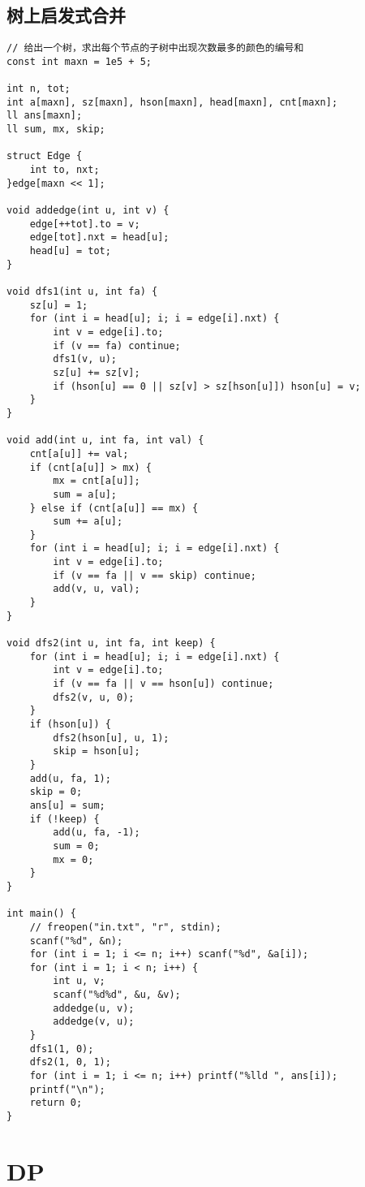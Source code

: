 \subsection{树上启发式合并}
\begin{lstlisting}
// 给出一个树，求出每个节点的子树中出现次数最多的颜色的编号和
const int maxn = 1e5 + 5;

int n, tot;
int a[maxn], sz[maxn], hson[maxn], head[maxn], cnt[maxn];
ll ans[maxn];
ll sum, mx, skip;

struct Edge {
	int to, nxt;
}edge[maxn << 1];

void addedge(int u, int v) {
	edge[++tot].to = v;
	edge[tot].nxt = head[u];
	head[u] = tot;
}

void dfs1(int u, int fa) {
	sz[u] = 1;
	for (int i = head[u]; i; i = edge[i].nxt) {
		int v = edge[i].to;
		if (v == fa) continue;
		dfs1(v, u);
		sz[u] += sz[v];
		if (hson[u] == 0 || sz[v] > sz[hson[u]]) hson[u] = v;
	}
}

void add(int u, int fa, int val) {
	cnt[a[u]] += val;
	if (cnt[a[u]] > mx) {
		mx = cnt[a[u]];
		sum = a[u];
	} else if (cnt[a[u]] == mx) {
		sum += a[u];
	}
	for (int i = head[u]; i; i = edge[i].nxt) {
		int v = edge[i].to;
		if (v == fa || v == skip) continue;
		add(v, u, val);
	}
}

void dfs2(int u, int fa, int keep) {
	for (int i = head[u]; i; i = edge[i].nxt) {
		int v = edge[i].to;
		if (v == fa || v == hson[u]) continue;
		dfs2(v, u, 0);
	}
	if (hson[u]) {
		dfs2(hson[u], u, 1);
		skip = hson[u];
	}
	add(u, fa, 1);
	skip = 0;
	ans[u] = sum;
	if (!keep) {
		add(u, fa, -1);
		sum = 0;
		mx = 0;
	}
}

int main() {
	// freopen("in.txt", "r", stdin);
	scanf("%d", &n);
	for (int i = 1; i <= n; i++) scanf("%d", &a[i]);
	for (int i = 1; i < n; i++) {
		int u, v;
		scanf("%d%d", &u, &v);
		addedge(u, v);
		addedge(v, u);
	}
	dfs1(1, 0);
	dfs2(1, 0, 1);
	for (int i = 1; i <= n; i++) printf("%lld ", ans[i]);
	printf("\n");
	return 0;
}
\end{lstlisting}

\section{DP}
